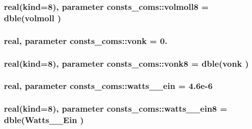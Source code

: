 \subsubsection[{\texorpdfstring{volmoll8}{volmoll8}}]{\setlength{\rightskip}{0pt plus 5cm}real(kind=8), parameter consts\+\_\+coms\+::volmoll8 = dble({\bf volmoll} )}\hypertarget{namespaceconsts__coms_af1e0f2c4db823ba0978a94ea03eb9158}{}\label{namespaceconsts__coms_af1e0f2c4db823ba0978a94ea03eb9158}
\subsubsection[{\texorpdfstring{vonk}{vonk}}]{\setlength{\rightskip}{0pt plus 5cm}real, parameter consts\+\_\+coms\+::vonk = 0.}\hypertarget{namespaceconsts__coms_ad66b0d002b8c2531bde3625010d94eac}{}\label{namespaceconsts__coms_ad66b0d002b8c2531bde3625010d94eac}
\subsubsection[{\texorpdfstring{vonk8}{vonk8}}]{\setlength{\rightskip}{0pt plus 5cm}real(kind=8), parameter consts\+\_\+coms\+::vonk8 = dble({\bf vonk} )}\hypertarget{namespaceconsts__coms_aba42a2e8791fbaccb96fdaec989bf033}{}\label{namespaceconsts__coms_aba42a2e8791fbaccb96fdaec989bf033}
\subsubsection[{\texorpdfstring{watts\+\_\+2\+\_\+ein}{watts_2_ein}}]{\setlength{\rightskip}{0pt plus 5cm}real, parameter consts\+\_\+coms\+::watts\+\_\+\_\+ein = 4.\+6e-\/6}\hypertarget{namespaceconsts__coms_aa14064c869d9c4d8d2b81b03e660b7d0}{}\label{namespaceconsts__coms_aa14064c869d9c4d8d2b81b03e660b7d0}
\subsubsection[{\texorpdfstring{watts\+\_\+2\+\_\+ein8}{watts_2_ein8}}]{\setlength{\rightskip}{0pt plus 5cm}real(kind=8), parameter consts\+\_\+coms\+::watts\+\_\+\_\+ein8 = dble(Watts\+\_\+\_\+\+Ein )}\hypertarget{namespaceconsts__coms_a58d5b3bd79a7637b140e4600eb27d5e9}{}\label{namespaceconsts__coms_a58d5b3bd79a7637b140e4600eb27d5e9}
